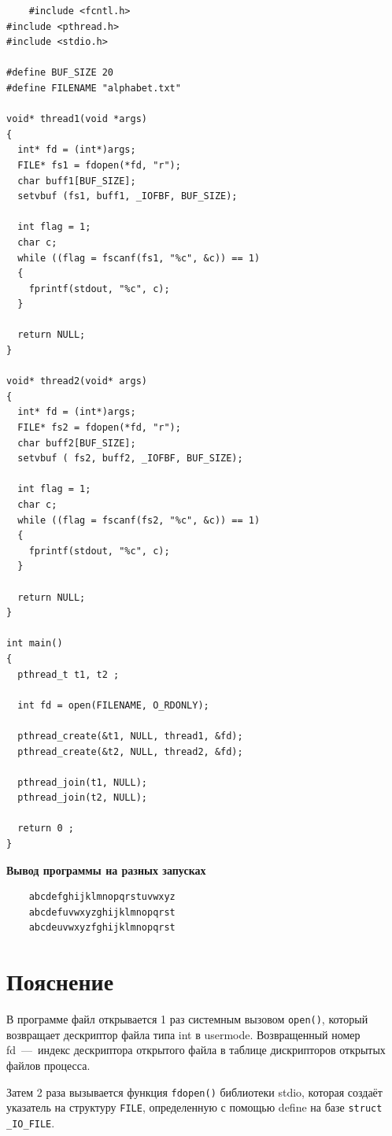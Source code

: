 \begin{lstlisting}
	#include <fcntl.h>
#include <pthread.h>
#include <stdio.h>

#define BUF_SIZE 20
#define FILENAME "alphabet.txt"

void* thread1(void *args) 
{
  int* fd = (int*)args;
  FILE* fs1 = fdopen(*fd, "r");
  char buff1[BUF_SIZE];
  setvbuf (fs1, buff1, _IOFBF, BUF_SIZE);

  int flag = 1;
  char c;
  while ((flag = fscanf(fs1, "%c", &c)) == 1)
  {
    fprintf(stdout, "%c", c);
  }

  return NULL;
}

void* thread2(void* args) 
{
  int* fd = (int*)args;
  FILE* fs2 = fdopen(*fd, "r");
  char buff2[BUF_SIZE];
  setvbuf ( fs2, buff2, _IOFBF, BUF_SIZE);

  int flag = 1;
  char c;
  while ((flag = fscanf(fs2, "%c", &c)) == 1) 
  {
    fprintf(stdout, "%c", c);
  }

  return NULL;
}

int main() 
{
  pthread_t t1, t2 ;

  int fd = open(FILENAME, O_RDONLY);

  pthread_create(&t1, NULL, thread1, &fd);
  pthread_create(&t2, NULL, thread2, &fd);

  pthread_join(t1, NULL);
  pthread_join(t2, NULL); 

  return 0 ;
}

\end{lstlisting}

\textbf{Вывод программы на разных запусках}

\begin{lstlisting}
	abcdefghijklmnopqrstuvwxyz
	abcdefuvwxyzghijklmnopqrst
	abcdeuvwxyzfghijklmnopqrst
\end{lstlisting}

\section{Пояснение}
В программе файл открывается 1 раз системным вызовом \texttt{open()},  который возвращает дескриптор файла типа int в usermode. Возвращенный номер fd~---~индекс дескриптора открытого файла в таблице дискрипторов открытых файлов процесса.
	
 Затем 2 раза вызывается функция \texttt{fdopen()} библиотеки stdio, которая создаёт указатель на структуру \texttt{FILE}, определенную с помощью define на базе \texttt{struct \_IO\_FILE}. 
 
